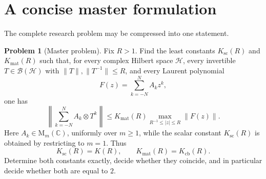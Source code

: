 \documentclass[11pt]{article}
\theoremstyle{definition}
\newtheorem{problem}[theorem]{Problem}
\theoremstyle{remark}
\newcommand{\C}{\mathbb C}
\newcommand{\cb}{\mathrm{cb}}
\newcommand{\Mat}{\mathrm M}
\begin{document}
\section{A concise master formulation}

The complete research problem may be compressed into one statement.

\begin{problem}[Master problem]
\label{prob:master}
Fix \(R>1\).  Find the least constants \(K_{\mathrm{sc}}(R)\) and
\(K_{\mathrm{mat}}(R)\) such that, for every complex Hilbert space
\(\mathcal H\), every invertible
\(T\in\mathcal B(\mathcal H)\) with
\(\|T\|,\|T^{-1}\|\leq R\), and every Laurent polynomial
\[
 F(z)=\sum_{k=-N}^{N}A_kz^k,
\]
one has
\[
 \left\|\sum_{k=-N}^{N}A_k\otimes T^k\right\|
 \leq
 K_{\mathrm{mat}}(R)
 \max_{R^{-1}\leq|z|\leq R}\|F(z)\|.
\]
Here \(A_k\in\Mat_m(\C)\), uniformly over \(m\geq1\), while the
scalar constant \(K_{\mathrm{sc}}(R)\) is obtained by restricting to
\(m=1\).  Thus
\[
 K_{\mathrm{sc}}(R)=K(R),
 \qquad
 K_{\mathrm{mat}}(R)=K_{\cb}(R).
\]
Determine both constants exactly, decide whether they coincide, and
in particular decide whether both are equal to \(2\).
\end{problem}
\end{document}
